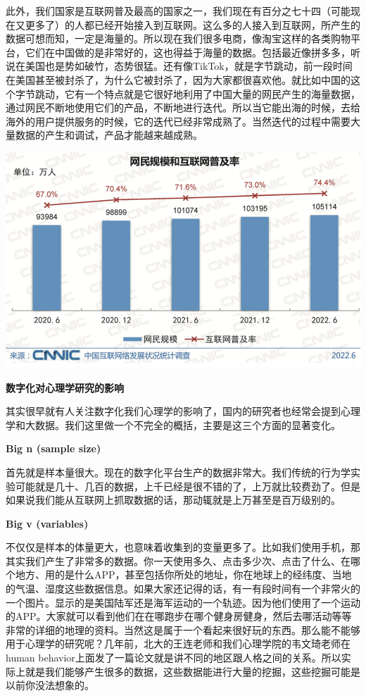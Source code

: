 \documentclass[
  oneside]{book}
\begin{document}
此外，我们国家是互联网普及最高的国家之一，我们现在有百分之七十四（可能现在又更多了）的人都已经开始接入到互联网。这么多的人接入到互联网，所产生的数据可想而知，一定是海量的。所以现在我们很多电商，像淘宝这样的各类购物平台，它们在中国做的是非常好的，这也得益于海量的数据。包括最近像拼多多，听说在美国也是势如破竹，态势很猛。还有像TikTok，就是字节跳动，前一段时间在美国甚至被封杀了，为什么它被封杀了，因为大家都很喜欢他。就比如中国的这个字节跳动，它有一个特点就是它很好地利用了中国大量的网民产生的海量数据，通过网民不断地使用它们的产品，不断地进行迭代。所以当它能出海的时候，去给海外的用户提供服务的时候，它的迭代已经非常成熟了。当然迭代的过程中需要大量数据的产生和调试，产品才能越来越成熟。

\includegraphics{1001-lesson1/image-20230302194931963.png}

\textbf{数字化对心理学研究的影响}

其实很早就有人关注数字化我们心理学的影响了，国内的研究者也经常会提到心理学和大数据。我们这里做一个不完全的概括，主要是这三个方面的显著变化。

\textbf{Big n (sample size)}

首先就是样本量很大。现在的数字化平台生产的数据非常大。我们传统的行为学实验可能就是几十、几百的数据，上千已经是很不错的了，上万就比较费劲了。但是如果说我们能从互联网上抓取数据的话，那动辄就是上万甚至是百万级别的。

\textbf{Big v (variables)}

不仅仅是样本的体量更大，也意味着收集到的变量更多了。比如我们使用手机，那其实我们产生了非常多的数据。你一天使用多久、点击多少次、点击了什么、在哪个地方、用的是什么APP，甚至包括你所处的地址，你在地球上的经纬度、当地的气温、湿度这些数据信息。如果大家还记得的话，有一有段时间有一个非常火的一个图片。显示的是美国陆军还是海军运动的一个轨迹。因为他们使用了一个运动的APP。大家就可以看到他们在在哪跑步在哪个健身房健身，然后去哪活动等等非常的详细的地理的资料。当然这是属于一个看起来很好玩的东西。那么能不能够用于心理学的研究呢？几年前，北大的王连老师和我们心理学院的韦文琦老师在human behavior上面发了一篇论文就是讲不同的地区跟人格之间的关系。所以实际上就是我们能够产生很多的数据，这些数据能进行大量的挖掘，这些挖掘可能是以前你没法想象的。
\end{document}
